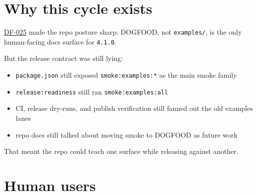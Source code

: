 \section{Why this cycle exists}\label{record-201-why-this-cycle-exists}

\href{https://github.com/flyingrobots/bijou/blob/cbd70612140e7a450d764b3c7be1c6af878b99bc/docs/design/DF-025-make-dogfood-the-only-human-facing-docs-surface.md}{DF-025} made the repo posture sharp: DOGFOOD, not \texttt{e\allowbreak{}x\allowbreak{}a\allowbreak{}m\allowbreak{}p\allowbreak{}l\allowbreak{}e\allowbreak{}s\allowbreak{}/}, is the only human-facing docs surface for \texttt{4\allowbreak{}.\allowbreak{}1\allowbreak{}.\allowbreak{}0}.

But the release contract was still lying:

\begin{itemize}
\tightlist
\item
  \texttt{p\allowbreak{}a\allowbreak{}c\allowbreak{}k\allowbreak{}a\allowbreak{}g\allowbreak{}e\allowbreak{}.\allowbreak{}j\allowbreak{}s\allowbreak{}o\allowbreak{}n} still exposed \texttt{s\allowbreak{}m\allowbreak{}o\allowbreak{}k\allowbreak{}e\allowbreak{}:\allowbreak{}e\allowbreak{}x\allowbreak{}a\allowbreak{}m\allowbreak{}p\allowbreak{}l\allowbreak{}e\allowbreak{}s\allowbreak{}:\allowbreak{}*} as the main smoke family
\item
  \texttt{r\allowbreak{}e\allowbreak{}l\allowbreak{}e\allowbreak{}a\allowbreak{}s\allowbreak{}e\allowbreak{}:\allowbreak{}r\allowbreak{}e\allowbreak{}a\allowbreak{}d\allowbreak{}i\allowbreak{}n\allowbreak{}e\allowbreak{}s\allowbreak{}s} still ran \texttt{s\allowbreak{}m\allowbreak{}o\allowbreak{}k\allowbreak{}e\allowbreak{}:\allowbreak{}e\allowbreak{}x\allowbreak{}a\allowbreak{}m\allowbreak{}p\allowbreak{}l\allowbreak{}e\allowbreak{}s\allowbreak{}:\allowbreak{}a\allowbreak{}l\allowbreak{}l}
\item
  CI, release dry-runs, and publish verification still fanned out the old examples lanes
\item
  repo docs still talked about moving smoke to DOGFOOD as future work
\end{itemize}

That meant the repo could teach one surface while releasing against another.

\section{Human users}\label{record-201-human-users}

